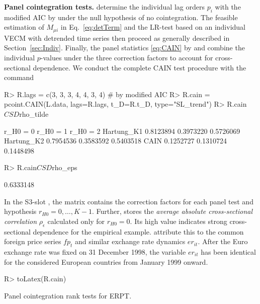 \textbf{Panel cointegration tests.} \citet{ArsovaOersal2020} determine the individual lag orders $ p_i $ with the modified AIC by \citet{QuPerron2007} under the null hypothesis of no cointegration. The feasible estimation of $ M_{\mu i} $ in Eq.~\eqref{eq:detTerm} and the LR-test based on an individual VECM with detrended time series then proceed as generally described in Section~\ref{sec:Indiv}. Finally, the panel statistics \eqref{eq:CAIN} by \citet{Hartung1999} and \citet{ArsovaOersal2020} combine the individual $ p $-values under the three correction factors to account for cross-sectional dependence. We conduct the complete CAIN test procedure with the  command
\begin{CodeChunk}
\begin{CodeInput}
R> R.lags = c(3, 3, 3, 4, 4, 3, 4)  # by modified AIC
R> R.cain = pcoint.CAIN(L.data, lags=R.lags, t_D=R.t_D, type="SL_trend")
R> R.cain$CSD$rho_tilde
\end{CodeInput}
\begin{CodeOutput}
            r_H0 = 0  r_H0 = 1  r_H0 = 2
Hartung_K1 0.8123894 0.3973220 0.5726069
Hartung_K2 0.7954536 0.3583592 0.5403518
CAIN       0.1252727 0.1310724 0.1448498
\end{CodeOutput}
\begin{CodeInput}
R> R.cain$CSD$rho_eps
\end{CodeInput}
\begin{CodeOutput}
[1] 0.6333148
\end{CodeOutput}
\end{CodeChunk}
In the \textsf{S3}-slot , the matrix  contains the correction factors for each panel test and hypothesis $ r_{H0} = 0,\ldots,K-1  $. Further,  stores the \textit{average absolute cross-sectional correlation} $ \rho_\epsilon $ calculated only for $ r_{H0} = 0 $. Its high value indicates strong cross-sectional dependence for the empirical example. \citet[p.~15]{ArsovaOersal2016} attribute this to the common foreign price series $ f\!p_{t} $ and similar exchange rate dynamics $ e\!r_{it} $. After the Euro exchange rate was fixed on 31 December 1998, the variable $ e\!r_{it} $ has been identical for the considered European countries from January 1999 onward.
\begin{CodeChunk}
\begin{CodeInput}
R> toLatex(R.cain)
\end{CodeInput}
\end{CodeChunk}
\begin{table}[ht]	%
	\centering
	\caption[Cointegration rank tests]{Panel cointegration rank tests for ERPT.} 
	\resizebox{0.6\textwidth}{!}{
		}	
	\label{tab:ERPT}
\end{table}
